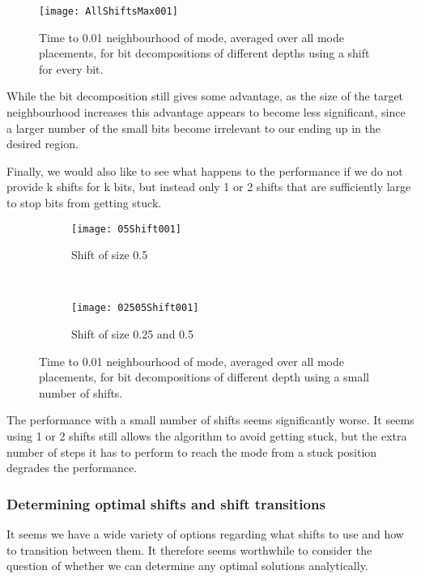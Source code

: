 \begin{figure}[h]
    \centering
    \texttt{[image: AllShiftsMax001]}
    \caption{Time to 0.01 neighbourhood of mode, averaged over all mode placements, for bit decompositions of different depths using a shift for every bit.}
    \label{fig:AllShiftsMax001}
\end{figure}

While the bit decomposition still gives some advantage, as the size of the target neighbourhood increases this advantage appears to become less significant, since a larger number of the small bits become irrelevant to our ending up in the desired region.

Finally, we would also like to see what happens to the performance if we do not provide k shifts for k bits, but instead only 1 or 2 shifts that are sufficiently large to stop bits from getting stuck. 

\begin{figure}[h]
    \centering
    \begin{subfigure}[t]{0.48\textwidth}
      \texttt{[image: 05Shift001]}
      \caption{Shift of size 0.5}
    \end{subfigure}
    ~
    \begin{subfigure}[t]{0.48\textwidth}
      \texttt{[image: 02505Shift001]}
      \caption{Shift of size 0.25 and 0.5}
    \end{subfigure}
    \caption{Time to 0.01 neighbourhood of mode, averaged over all mode placements, for bit decompositions of different depth using a small number of shifts.}
    \label{fig:fewShifts}
\end{figure}

The performance with a small number of shifts seems significantly worse. It seems using 1 or 2 shifts still allows the algorithm to avoid getting stuck, but the extra number of steps it has to perform to reach the mode from a stuck position degrades the performance.

\subsubsection{Determining optimal shifts and shift transitions}
It seems we have a wide variety of options regarding what shifts to use and how to transition between them. It therefore seems worthwhile to consider the question of whether we can determine any optimal solutions analytically. 

